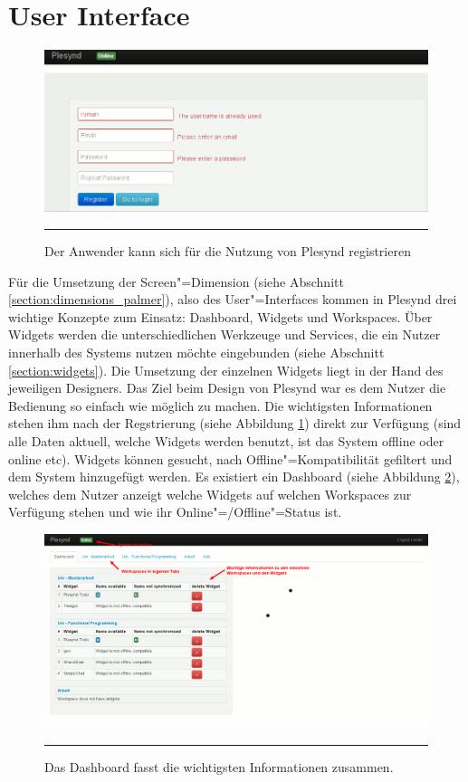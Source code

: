 \section{User Interface}\label{section:user_interface}
\begin{figure}[hb]
  \centering
  \includegraphics[]{./Figures/plesynd_register.png}
    \rule{35em}{0.5pt}
  \caption[Plesynd User"=Interface: Registrieren]{Der Anwender kann sich für die Nutzung von Plesynd registrieren}
  \label{fig:plesynd_register}
\end{figure}

Für die Umsetzung der Screen"=Dimension (siehe Abschnitt \ref{section:dimensions_palmer}), also des User"=Interfaces kommen in Plesynd drei wichtige Konzepte zum Einsatz: Dashboard, Widgets und Workspaces. Über Widgets werden die unterschiedlichen Werkzeuge und Services, die ein Nutzer innerhalb des Systems nutzen möchte eingebunden (siehe Abschnitt \ref{section:widgets}). Die Umsetzung der einzelnen Widgets liegt in der Hand des jeweiligen Designers. Das Ziel beim Design von Plesynd war es dem Nutzer die Bedienung so einfach wie möglich zu machen. Die wichtigsten Informationen stehen ihm nach der Regstrierung (siehe Abbildung \ref{fig:plesynd_register}) direkt zur Verfügung (sind alle Daten aktuell, welche Widgets werden benutzt, ist das System offline oder online etc). Widgets können gesucht, nach Offline"=Kompatibilität gefiltert und dem System hinzugefügt werden. Es existiert ein Dashboard (siehe Abbildung \ref{fig:plesynd_dashboard}), welches dem Nutzer anzeigt welche Widgets auf welchen Workspaces zur Verfügung stehen und wie ihr Online"=/Offline"=Status ist.
\begin{figure}
  \centering
  \includegraphics[]{./Figures/plesynd_dashboard.png}
    \rule{35em}{0.5pt}
  \caption[Plesynd User"=Interface: Dashboard]{Das Dashboard fasst die wichtigsten Informationen zusammen.}
  \label{fig:plesynd_dashboard}
\end{figure}


